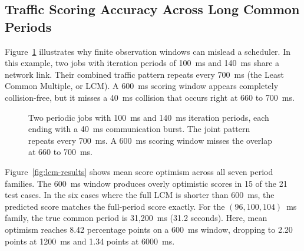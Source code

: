 \documentclass[conference]{IEEEtran}
\begin{document}
\subsection{Traffic Scoring Accuracy Across Long Common Periods}

Figure~\ref{fig:lcm-window} illustrates why finite observation windows can mislead a scheduler. In this example, two jobs with iteration periods of 100~ms and 140~ms share a network link. Their combined traffic pattern repeats every 700~ms (the Least Common Multiple, or LCM). A 600~ms scoring window appears completely collision-free, but it misses a 40~ms collision that occurs right at 660 to 700~ms.

\begin{figure}[t]
\centering
{}
\caption{Two periodic jobs with 100~ms and 140~ms iteration periods, each ending with a 40~ms communication burst. The joint pattern repeats every 700~ms. A 600~ms scoring window misses the overlap at 660 to 700~ms.}
\label{fig:lcm-window}
\end{figure}

Figure~\ref{fig:lcm-results} shows mean score optimism across all seven period families. The 600~ms window produces overly optimistic scores in 15 of the 21 test cases. In the six cases where the full LCM is shorter than 600~ms, the predicted score matches the full-period score exactly. For the $(96, 100, 104)$~ms family, the true common period is 31,200~ms (31.2 seconds). Here, mean optimism reaches 8.42 percentage points on a 600~ms window, dropping to 2.20 points at 1200~ms and 1.34 points at 6000~ms.
\end{document}
